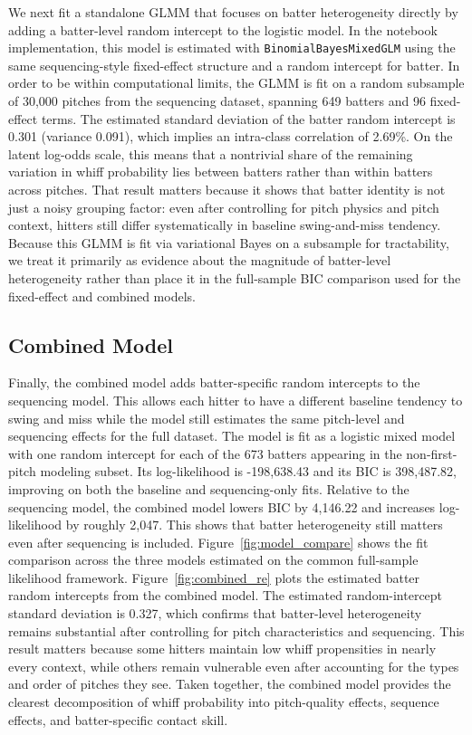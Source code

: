 \documentclass[11pt]{article}
\newcommand{\glmmObs}{30{,}000}
\newcommand{\glmmBatters}{649}
\newcommand{\glmmFixed}{96}
\newcommand{\glmmSigma}{0.301}
\newcommand{\glmmSigmaSq}{0.091}
\newcommand{\glmmICC}{2.69}
\newcommand{\combLogLik}{-198{,}638.43}
\newcommand{\combBIC}{398{,}487.82}
\newcommand{\combRandSD}{0.327}
\begin{document}
We next fit a standalone GLMM that focuses on batter heterogeneity directly by adding a batter-level random intercept to the logistic model.
In the notebook implementation, this model is estimated with \texttt{BinomialBayesMixedGLM} using the same sequencing-style fixed-effect structure and a random intercept for batter.
In order to be within computational limits, the GLMM is fit on a random subsample of \glmmObs{} pitches from the sequencing dataset, spanning \glmmBatters{} batters and \glmmFixed{} fixed-effect terms.
The estimated standard deviation of the batter random intercept is \glmmSigma{} (variance \glmmSigmaSq{}), which implies an intra-class correlation of \glmmICC\%.
On the latent log-odds scale, this means that a nontrivial share of the remaining variation in whiff probability lies between batters rather than within batters across pitches.
That result matters because it shows that batter identity is not just a noisy grouping factor: even after controlling for pitch physics and pitch context, hitters still differ systematically in baseline swing-and-miss tendency.
Because this GLMM is fit via variational Bayes on a subsample for tractability, we treat it primarily as evidence about the magnitude of batter-level heterogeneity rather than place it in the full-sample BIC comparison used for the fixed-effect and combined models.

\subsection{Combined Model}

Finally, the combined model adds batter-specific random intercepts to the sequencing model. This allows each hitter to have a different baseline tendency to swing and miss while the model still estimates the same pitch-level and sequencing effects for the full dataset.
The model is fit as a logistic mixed model with one random intercept for each of the 673 batters appearing in the non-first-pitch modeling subset.
Its log-likelihood is \combLogLik{} and its BIC is \combBIC{}, improving on both the baseline and sequencing-only fits.
Relative to the sequencing model, the combined model lowers BIC by 4{,}146.22 and increases log-likelihood by roughly 2{,}047. This shows that batter heterogeneity still matters even after sequencing is included.
Figure~\ref{fig:model_compare} shows the fit comparison across the three models estimated on the common full-sample likelihood framework. Figure~\ref{fig:combined_re} plots the estimated batter random intercepts from the combined model.
The estimated random-intercept standard deviation is \combRandSD{}, which confirms that batter-level heterogeneity remains substantial after controlling for pitch characteristics and sequencing.
This result matters because some hitters maintain low whiff propensities in nearly every context, while others remain vulnerable even after accounting for the types and order of pitches they see.
Taken together, the combined model provides the clearest decomposition of whiff probability into pitch-quality effects, sequence effects, and batter-specific contact skill.
\end{document}
